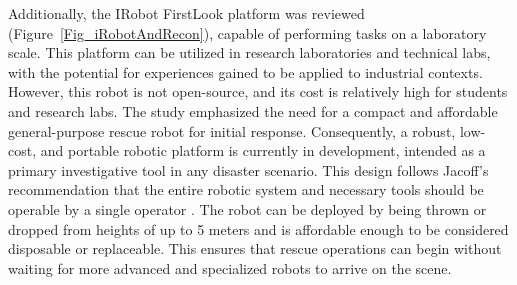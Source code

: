 \documentclass[conference]{IEEEtran}
\begin{document}
Additionally, the IRobot FirstLook platform \cite{iRobot_FirstLook} was reviewed (Figure~\ref{Fig_iRobotAndRecon}), capable of performing tasks on a laboratory scale. This platform can be utilized in research laboratories and technical labs, with the potential for experiences gained to be applied to industrial contexts. However, this robot is not open-source, and its cost is relatively high for students and research labs. The study emphasized the need for a compact and affordable general-purpose rescue robot for initial response. Consequently, a robust, low-cost, and portable robotic platform is currently in development, intended as a primary investigative tool in any disaster scenario. This design follows Jacoff's recommendation that the entire robotic system and necessary tools should be operable by a single operator \cite{Murphy2008}. The robot can be deployed by being thrown or dropped from heights of up to 5 meters and is affordable enough to be considered disposable or replaceable. This ensures that rescue operations can begin without waiting for more advanced and specialized robots to arrive on the scene.
\end{document}
